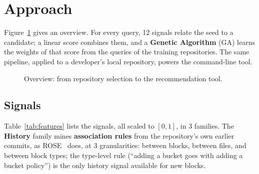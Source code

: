 \section{Approach}
\label{sec:approach}

Figure~\ref{fig:pipeline} gives an overview. For every query, 12 signals relate the seed to a
candidate; a linear score combines them, and a \textbf{Genetic Algorithm} (GA) learns the weights of that score
from the queries of the training repositories. The same pipeline, applied to a developer's local
repository, powers the \tool{} command-line tool.

\begin{figure}[ht]
\centering
{}
\caption{\small Overview: from repository selection to the recommendation tool.}
\label{fig:pipeline}
\end{figure}

\subsection{Signals}
Table~\ref{tab:features} lists the signals, all scaled to $[0, 1]$, in 3 families. The
\textbf{History} family mines \textbf{association rules} from the repository's own earlier commits, as
ROSE~\cite{zimmermann2004rose} does, at 3 granularities: between blocks, between files, and
between block types; the type-level rule (``adding a bucket goes with adding a bucket policy'') is
the only history signal available for new blocks.

